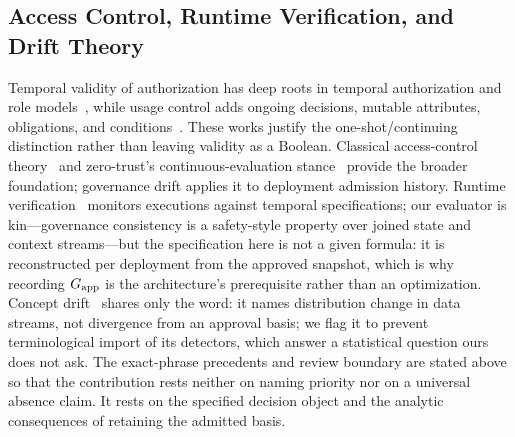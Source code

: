 \subsection{Access Control, Runtime Verification, and Drift Theory}
Temporal validity of authorization has deep roots in temporal authorization
and role models~\cite{bertino1994temporal,bertino2001trbac}, while usage
control adds ongoing decisions, mutable attributes, obligations, and
conditions~\cite{park2004ucon,schoepp2023usage}. These works justify the
one-shot/continuing distinction rather than leaving validity as a Boolean.
Classical access-control theory~\cite{sandhu1996,clark1987} and zero-trust's
continuous-evaluation stance~\cite{nist800207} provide the broader foundation;
governance drift applies it to deployment admission history. Runtime
verification~\cite{leucker2009,pnueli1977} monitors executions against
temporal specifications; our evaluator is kin---governance consistency is a
safety-style property over joined state and context streams---but the
specification here is not a given formula: it is reconstructed per deployment
from the approved snapshot, which is why recording $G_{\mathrm{app}}$ is the
architecture's prerequisite rather than an optimization. Concept
drift~\cite{gama2014} shares only the word: it names distribution change in
data streams, not divergence from an approval basis; we flag it to prevent
terminological import of its detectors, which answer a statistical question
ours does not ask. The exact-phrase precedents and review boundary are stated
above so that the contribution rests neither on naming priority nor on a
universal absence claim. It rests on the specified decision object and the
analytic consequences of retaining the admitted basis.

